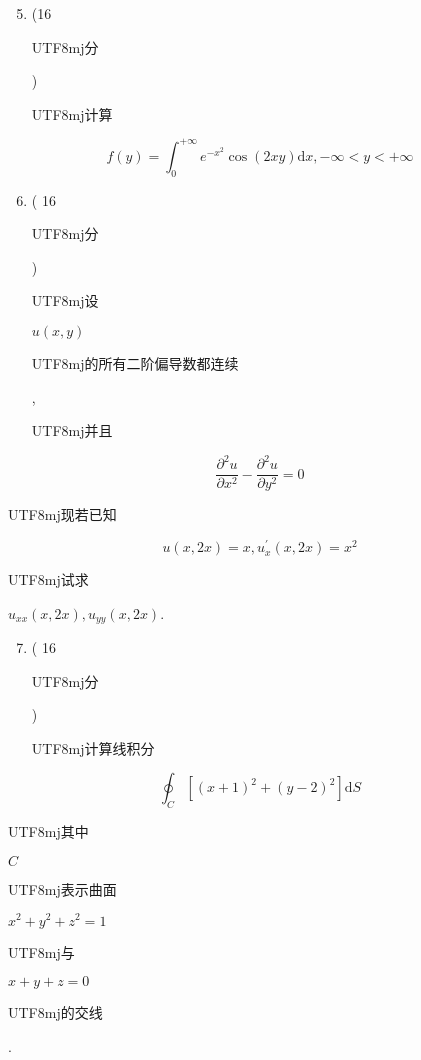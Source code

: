 \documentclass[10pt]{article}
\begin{document}
\begin{enumerate}
  \setcounter{enumi}{4}
  \item (16 \begin{CJK}{UTF8}{mj}分\end{CJK}) \begin{CJK}{UTF8}{mj}计算\end{CJK}
\end{enumerate}
$$
f(y)=\int_{0}^{+\infty} e^{-x^{2}} \cos (2 x y) \mathrm{d} x,-\infty<y<+\infty
$$

\begin{enumerate}
  \setcounter{enumi}{5}
  \item ( 16 \begin{CJK}{UTF8}{mj}分\end{CJK}) \begin{CJK}{UTF8}{mj}设\end{CJK} $u(x, y)$ \begin{CJK}{UTF8}{mj}的所有二阶偏导数都连续\end{CJK}, \begin{CJK}{UTF8}{mj}并且\end{CJK}
\end{enumerate}
$$
\frac{\partial^{2} u}{\partial x^{2}}-\frac{\partial^{2} u}{\partial y^{2}}=0
$$
\begin{CJK}{UTF8}{mj}现若已知\end{CJK}
$$
u(x, 2 x)=x, u_{x}^{\prime}(x, 2 x)=x^{2}
$$
\begin{CJK}{UTF8}{mj}试求\end{CJK} $u_{x x}(x, 2 x), u_{y y}(x, 2 x)$.

\begin{enumerate}
  \setcounter{enumi}{6}
  \item ( 16 \begin{CJK}{UTF8}{mj}分\end{CJK}) \begin{CJK}{UTF8}{mj}计算线积分\end{CJK}
\end{enumerate}
$$
\oint_{C}\left[(x+1)^{2}+(y-2)^{2}\right] \mathrm{d} S
$$
\begin{CJK}{UTF8}{mj}其中\end{CJK} $C$ \begin{CJK}{UTF8}{mj}表示曲面\end{CJK} $x^{2}+y^{2}+z^{2}=1$ \begin{CJK}{UTF8}{mj}与\end{CJK} $x+y+z=0$ \begin{CJK}{UTF8}{mj}的交线\end{CJK}.
\end{document}
